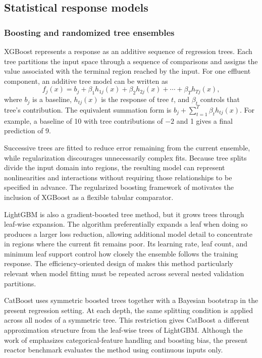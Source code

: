 \subsection{Statistical response models}

\subsubsection{Boosting and randomized tree ensembles}

XGBoost represents a response as an additive sequence of regression trees. Each tree partitions the input space through a sequence of comparisons and assigns the value associated with the terminal region reached by the input. For one effluent component, an additive tree model can be written as
\[
f_j(x)=b_j+\beta_1h_{1j}(x)+\beta_2h_{2j}(x)+\cdots+\beta_Th_{Tj}(x),
\]
where $b_j$ is a baseline, $h_{tj}(x)$ is the response of tree $t$, and $\beta_t$ controls that tree's contribution. The equivalent summation form is
$b_j+\sum_{t=1}^T\beta_th_{tj}(x)$.
For example, a baseline of 10 with tree contributions of $-2$ and 1 gives a final prediction of 9.

Successive trees are fitted to reduce error remaining from the current ensemble, while regularization discourages unnecessarily complex fits. Because tree splits divide the input domain into regions, the resulting model can represent nonlinearities and interactions without requiring those relationships to be specified in advance. The regularized boosting framework of \citet{ChenGuestrin2016} motivates the inclusion of XGBoost as a flexible tabular comparator.

LightGBM is also a gradient-boosted tree method, but it grows trees through leaf-wise expansion. The algorithm preferentially expands a leaf when doing so produces a larger loss reduction, allowing additional model detail to concentrate in regions where the current fit remains poor. Its learning rate, leaf count, and minimum leaf support control how closely the ensemble follows the training response. The efficiency-oriented design of \citet{Ke2017} makes this method particularly relevant when model fitting must be repeated across several nested validation partitions.

CatBoost uses symmetric boosted trees together with a Bayesian bootstrap in the present regression setting. At each depth, the same splitting condition is applied across all nodes of a symmetric tree. This restriction gives CatBoost a different approximation structure from the leaf-wise trees of LightGBM. Although the work of \citet{Prokhorenkova2018} emphasizes categorical-feature handling and boosting bias, the present reactor benchmark evaluates the method using continuous inputs only.

